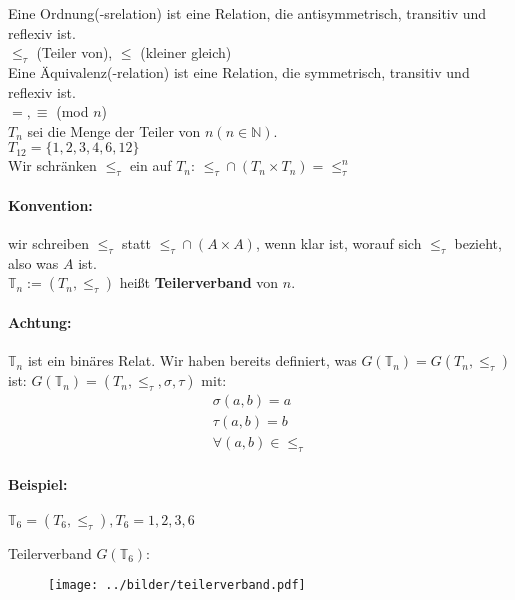 \noindent Eine Ordnung(-srelation) ist eine Relation, die antisymmetrisch,
transitiv und reflexiv ist. \\  $\le_\tau$
(Teiler von), $\le$ (kleiner gleich) \\

\noindent Eine Äquivalenz(-relation) ist eine Relation, die symmetrisch,
transitiv und reflexiv ist. \\  $=, \equiv$ (mod $n$) \\

\noindent $T_n$ sei die Menge der Teiler von $n (n \in \mathbb{N})$. \\  $T_{12} = \{ 1, 2, 3, 4, 6, 12 \}$ \\

\noindent Wir schränken $\le_\tau$ ein auf $T_n$: $\le_\tau \cap (T_n \times T_n) = \le_\tau^n$

\paragraph{Konvention:} wir schreiben $\le_\tau$ statt $\le_\tau \cap (A \times A)$, wenn klar ist, worauf sich $\le_\tau$ bezieht, also was $A$ ist. \\

\noindent $\mathbb{T}_n := (T_n, \le_\tau)$ heißt {\bf Teilerverband} von $n$.

\paragraph{Achtung:} $\mathbb{T}_n$ ist ein binäres Relat. Wir haben
bereits definiert, was $G (\mathbb{T}_n) = G (T_n, \le_\tau)$ ist:
$G (\mathbb{T}_n) = (T_n, \le_\tau, \sigma, \tau) \text{ mit:}$
\begin{align*}
\sigma (a, b) = a\\
\tau (a, b) = b\\
\forall (a, b) \in \le_\tau
\end{align*}

\paragraph{Beispiel:} $\mathbb{T}_6 = (T_6, \le_\tau), T_6 = { 1, 2, 3, 6}$

Teilerverband $G (\mathbb{T}_6) $:
\begin{figure}[h]
  \texttt{[image: ../bilder/teilerverband.pdf]}
\end{figure}

